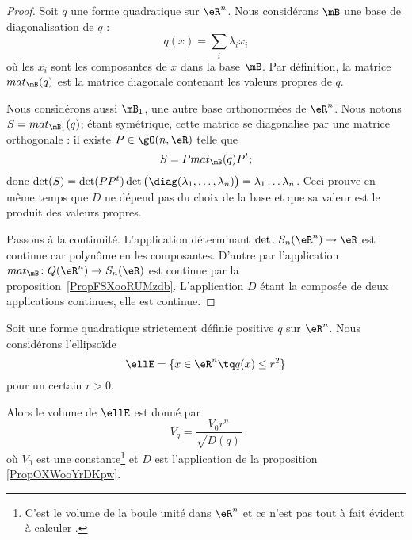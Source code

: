 \begin{proof}
    Soit \( q\) une forme quadratique sur \( \eR^n\). Nous considérons \( \mB\) une base de diagonalisation de \( q\) :
    \begin{equation}
        q(x)=\sum_i\lambda_ix_i
    \end{equation}
    où les \( x_i\) sont les composantes de \( x\) dans la base \( \mB\). Par définition, la matrice \( mat_{\mB}(q)\) est la matrice diagonale contenant les valeurs propres de \( q\).

    Nous considérons aussi \( \mB_1\), une autre base orthonormées de \( \eR^n\). Nous notons \( S=mat_{\mB_1}(q)\); étant symétrique, cette matrice se diagonalise par une matrice orthogonale : il existe \( P\in\gO(n,\eR)\) telle que
    \begin{equation}
        S=P mat_{\mB}(q)P^t;
    \end{equation}
    donc \( \det(S)=\det(PP^t)\det\big( \diag(\lambda_1,\ldots, \lambda_n) \big)=\lambda_1\ldots\lambda_n\). Ceci prouve en même temps que \( D\) ne dépend pas du choix de la base et que sa valeur est le produit des valeurs propres.

    Passons à la continuité. L'application déterminant \( \det\colon S_n(\eR^n)\to \eR\) est continue car polynôme en les composantes. D'autre par l'application \( mat_{\mB}\colon Q(\eR^n)\to S_n(\eR)\) est continue par la proposition~\ref{PropFSXooRUMzdb}. L'application  \( D\) étant la composée de deux applications continues, elle est continue.
\end{proof}

\begin{lemma}       \label{LEMooLSTOooZiEOdx}
    Soit une forme quadratique strictement définie positive \( q\) sur \( \eR^n\). Nous considérons l'ellipsoïde
    \begin{equation}
        \ellE=\{ x\in \eR^n\tq q(x)\leq r^2 \}
    \end{equation}
    pour un certain \( r>0\).

    Alors le volume de \( \ellE\) est donné par
    \begin{equation}
        V_q=\frac{ V_0 r^n }{ \sqrt{ D(q) } }
    \end{equation}
    où \( V_0\) est une constante\footnote{C'est le volume de la boule unité dans \( \eR^n\) et ce n'est pas tout à fait évident à calculer \cite{ooVLVAooXWmUVB}.} et \( D\) est l'application de la proposition \ref{PropOXWooYrDKpw}.
\end{lemma}

